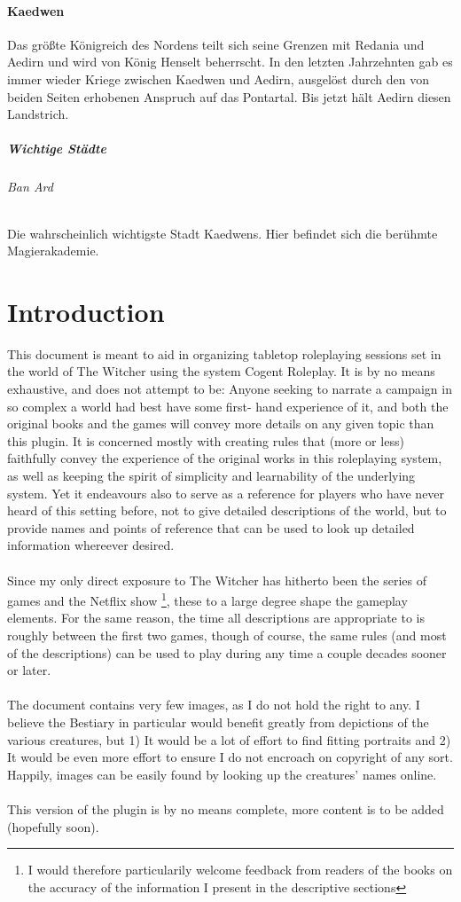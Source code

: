 \documentclass[parskip=full,11pt,%
footheight=38pt]{scrreport}
\begin{document}
	\subsubsection{Kaedwen}
	Das größte Königreich des Nordens teilt sich seine Grenzen mit Redania und Aedirn und wird von König Henselt beherrscht. In den letzten Jahrzehnten gab es immer wieder Kriege zwischen Kaedwen und Aedirn, ausgelöst durch den von beiden Seiten erhobenen Anspruch auf das Pontartal. Bis jetzt hält Aedirn diesen Landstrich.
	\paragraph{Wichtige Städte}
	\subparagraph{Ban Ard}
	Die wahrscheinlich wichtigste Stadt Kaedwens. Hier befindet sich die berühmte Magierakademie.
\fi

\chapter*{Introduction}
This document is meant to aid in organizing tabletop roleplaying sessions set in the world of The Witcher using the system Cogent Roleplay.
It is by no means exhaustive, and does not attempt to be: Anyone seeking to narrate a campaign in so complex a world had best have some first-
hand experience of it, and both the original books and the games will convey more details on any given topic than this plugin. It is concerned
mostly with creating rules that (more or less) faithfully convey the experience of the original works in this roleplaying system, as well as
keeping the spirit of simplicity and learnability of the underlying system. Yet it
endeavours also to serve as a reference for players who have never heard of this setting before, not to give detailed descriptions of the world,
but to provide names and points of reference that can be used to look up detailed information whereever desired.
\\\\
Since my only direct exposure to The Witcher has hitherto been the series of games and the Netflix show
\footnote{I would therefore particularily welcome feedback from readers of the books on the accuracy of the information I present in the descriptive
	sections}, these to a large degree shape the gameplay elements.
For the same reason, the time all descriptions are appropriate to is roughly between the first two games, though of course, the same rules (and
most of the descriptions) can be used to play during any time a couple decades sooner or later.
\\\\
The document contains very few images, as I do not hold the right to any. I believe the Bestiary in particular would benefit greatly
from depictions of the various creatures, but 1) It would be a lot of effort to find fitting portraits and 2) It would be even more effort to
ensure I do not encroach on copyright of any sort. Happily, images can be easily found by looking up the creatures' names online.
\\\\
This version of the plugin is by no means complete, more content is to be added (hopefully soon).
\end{document}
